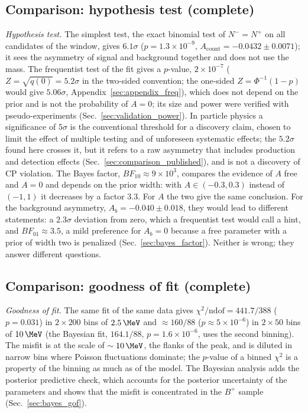 \subsection{Comparison: hypothesis test (complete)}
\emph{Hypothesis test.} The simplest test, the exact binomial test of $N^-=N^+$ on all candidates of the window, gives $6.1\sigma$ ($p=1.3\times10^{-9}$, $A_{\mathrm{count}}=-0.0432\pm0.0071$); it sees the asymmetry of signal and background together and does not use the mass. The frequentist test of the fit gives a $p$-value, $2\times10^{-7}$ ($Z=\sqrt{q(0)}=5.2\sigma$ in the two-sided convention; the one-sided $Z=\Phi^{-1}(1-p)$ would give $5.06\sigma$, Appendix~\ref{sec:appendix_freq}), which does not depend on the prior and is not the probability of $A=0$; its size and power were verified with pseudo-experiments (Sec.~\ref{sec:validation_power}). In particle physics a significance of $5\sigma$ is the conventional threshold for a discovery claim, chosen to limit the effect of multiple testing and of unforeseen systematic effects; the $5.2\sigma$ found here crosses it, but it refers to a raw asymmetry that includes production and detection effects (Sec.~\ref{sec:comparison_published}), and is not a discovery of CP violation. The Bayes factor, $BF_{10}\approx9\times10^3$, compares the evidence of $A$ free and $A=0$ and depends on the prior width: with $A\in(-0.3,0.3)$ instead of $(-1,1)$ it decreases by a factor $3.3$. For $A$ the two give the same conclusion. For the background asymmetry, $A_b=-0.040\pm0.018$, they would lead to different statements: a $2.3\sigma$ deviation from zero, which a frequentist test would call a hint, and $BF_{01}\approx3.5$, a mild preference for $A_b=0$ because a free parameter with a prior of width two is penalized (Sec.~\ref{sec:bayes_factor}). Neither is wrong; they answer different questions.

\subsection{Comparison: goodness of fit (complete)}
\emph{Goodness of fit.} The same fit of the same data gives $\chi^2/\mathrm{ndof}=441.7/388$ ($p=0.031$) in $2\times200$ bins of $2.5\,\MeV$ and $\approx160/88$ ($p\approx5\times10^{-6}$) in $2\times50$ bins of $10\,\MeV$ (the Bayesian fit, $164.1/88$, $p=1.6\times10^{-6}$, uses the second binning). The misfit is at the scale of $\sim10\,\MeV$, the flanks of the peak, and is diluted in narrow bins where Poisson fluctuations dominate; the $p$-value of a binned $\chi^2$ is a property of the binning as much as of the model. The Bayesian analysis adds the posterior predictive check, which accounts for the posterior uncertainty of the parameters and shows that the misfit is concentrated in the $B^+$ sample (Sec.~\ref{sec:bayes_gof}).

